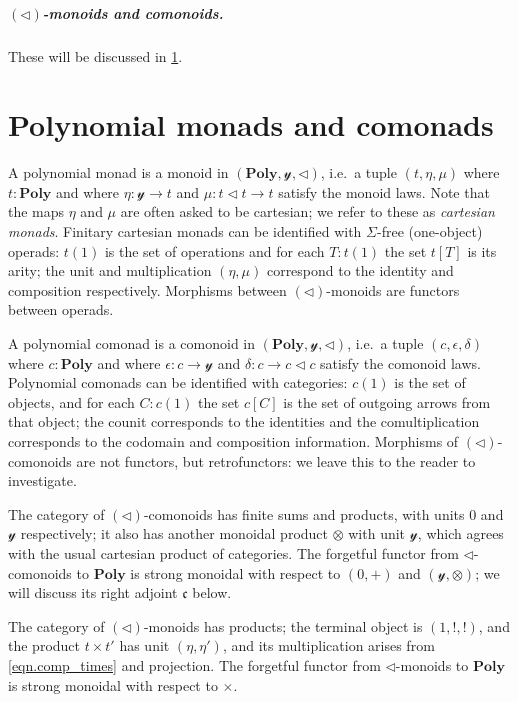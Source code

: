\documentclass[11pt, one side, article]{memoir}
\theoremstyle{definition}
\theoremstyle{plain}
\newcommand{\Cat}[1]{\mathbf{#1}}%
\newcommand{\yon}{{\mathcal{y}}}
\newcommand{\poly}{\Cat{Poly}}
\newcommand{\0}{\textsf{0}}
\newcommand{\1}{\tn{\textsf{1}}}
\newcommand{\tri}{\mathbin{\triangleleft}}
\newcommand{\cofree}{\mathfrak{c}}
\begin{document}
\paragraph{$(\tri)$-monoids and comonoids.} These will be discussed in \cref{chap.monad_comonad}.


\chapter{Polynomial monads and comonads}\label{chap.monad_comonad}

A polynomial monad is a monoid in $(\poly,\yon,\tri)$, i.e.\ a tuple $(t,\eta,\mu)$ where $t:\poly$ and where $\eta\colon\yon\to t$ and $\mu\colon t\tri t\to t$ satisfy the monoid laws. Note that the maps $\eta$ and $\mu$ are often asked to be cartesian; we refer to these as \emph{cartesian monads}. Finitary cartesian monads can be identified with $\Sigma$-free (one-object) operads: $t(1)$ is the set of operations and for each $T:t(1)$ the set $t[T]$ is its arity; the unit and multiplication $(\eta,\mu)$ correspond to the identity and composition respectively. Morphisms between $(\tri)$-monoids are functors between operads.


A polynomial comonad is a comonoid in $(\poly,\yon,\tri)$, i.e.\ a tuple $(c,\epsilon,\delta)$ where $c:\poly$ and where $\epsilon\colon c\to\yon$ and $\delta\colon c\to c\tri c$ satisfy the comonoid laws. Polynomial comonads can be identified with categories: $c(1)$ is the set of objects, and for each $C:c(1)$ the set $c[C]$ is the set of outgoing arrows from that object; the counit corresponds to the identities and the comultiplication corresponds to the codomain and composition information. Morphisms of $(\tri)$-comonoids are not functors, but retrofunctors: we leave this to the reader to investigate.

The category of $(\tri)$-comonoids has finite sums and products, with units $0$ and $\yon$ respectively; it also has another monoidal product $\otimes$ with unit $\yon$, which agrees with the usual cartesian product of categories. The forgetful functor from $\tri$-comonoids to $\poly$ is strong monoidal with respect to $(0,+)$ and $(\yon,\otimes)$; we will discuss its right adjoint $\cofree$ below.

The category of $(\tri)$-monoids has products; the terminal object is $(1,!,!)$, and the product $t\times t'$ has unit $(\eta,\eta')$, and its multiplication arises from \eqref{eqn.comp_times} and projection. The forgetful functor from $\tri$-monoids to $\poly$ is strong monoidal with respect to $\times$. 
\end{document}
